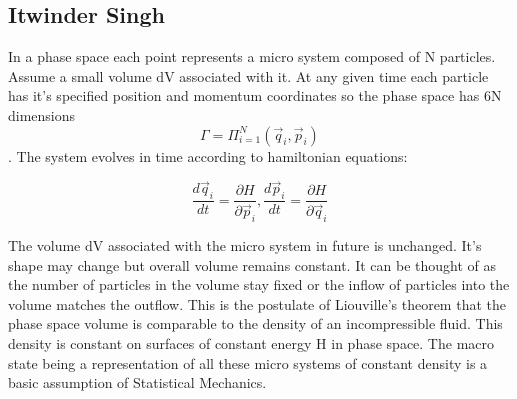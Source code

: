 \subsection{Itwinder Singh}
In a phase space each point represents a micro system composed of N particles. Assume a small volume dV associated with it. At any given time each particle has it's specified position and momentum coordinates so the phase space has 6N dimensions
$$\Gamma=\Pi_{i=1}^N (\Vec{q}_i,\vec{p}_i) $$. 
The system evolves in time according to hamiltonian equations:

\begin{equation}
    \frac{d\vec{q}_i}{dt}=\frac{\partial{H}}{\partial\vec{p}_i},  
    \frac{d\vec{p}_i}{dt}=\frac{\partial{H}}{\partial\vec{q}_i}
\end{equation}

The volume dV associated with the micro system in future is unchanged. It's shape may change but overall volume remains constant. It can be thought of as the number of particles in the volume stay fixed or the inflow of particles into the volume matches the outflow. This is the postulate of Liouville's theorem that the phase space volume is comparable to the density of an incompressible fluid. 
This density is constant on surfaces of constant energy H in phase space. The macro state being a representation of all these micro systems of constant density is a basic assumption of Statistical Mechanics.

    

 


